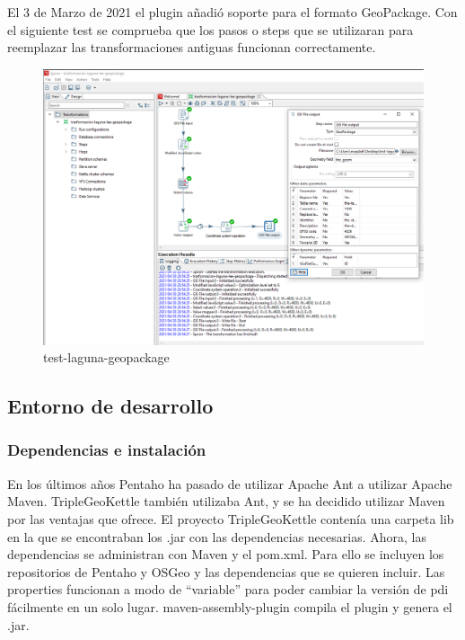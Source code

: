 El 3 de Marzo de 2021 el plugin añadió soporte para el formato GeoPackage. Con el siguiente test se comprueba que los
pasos o steps que se utilizaran para reemplazar las transformaciones antiguas funcionan correctamente.

\begin{figure}[H]
    \includegraphics[width=\textwidth]{images/test-laguna-geopackage.png}
    \centering
    \caption{test-laguna-geopackage}
    \label{fig:test-laguna-geopackage}
\end{figure}

\subsection{Entorno de desarrollo}

\subsubsection{Dependencias e instalación}

En los últimos años Pentaho ha pasado de utilizar Apache Ant a utilizar Apache Maven. TripleGeoKettle también
utilizaba Ant, y se ha decidido utilizar Maven por las ventajas que ofrece. El proyecto TripleGeoKettle contenía
una carpeta lib en la que se encontraban los .jar con las dependencias necesarias. Ahora, las dependencias se
administran con Maven y el pom.xml. Para ello se incluyen los repositorios de Pentaho y OSGeo y las dependencias
que se quieren incluir. Las properties funcionan a modo de ``variable'' para poder cambiar la versión de pdi
fácilmente en un solo lugar. maven-assembly-plugin compila el plugin y genera el .jar.


